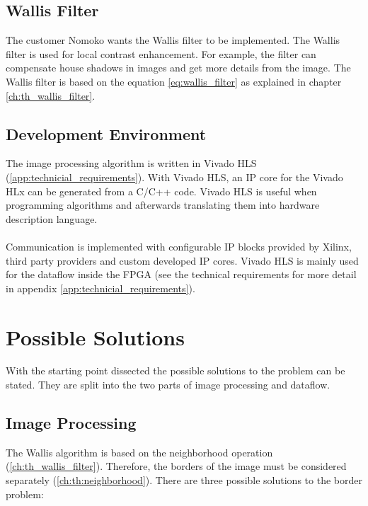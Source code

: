 \subsection{Wallis Filter} \label{chapt:mission:wallis}
The customer Nomoko wants the Wallis filter to be implemented. The Wallis
filter is used for local contrast enhancement. For example, the filter can compensate house shadows in images and get more details from the image. 
The Wallis filter is based on the equation \ref{eq:wallis_filter} as explained in chapter \ref{ch:th_wallis_filter}.


\subsection{Development Environment}
The image processing algorithm is written in Vivado HLS (\ref{app:technicial_requirements}). With Vivado HLS, an IP core for the Vivado HLx can be generated from a C/C++ code. Vivado HLS is useful when programming algorithms and afterwards translating them into hardware description language. \\ 
\\
Communication is implemented with configurable IP blocks provided by Xilinx,
third party providers and custom developed IP cores. Vivado HLS is mainly used
for the dataflow inside the FPGA
(see the technical requirements for more detail in appendix 
\ref{app:technicial_requirements}).

%
%
\section{Possible Solutions} \label{chapt:solutions}
With the starting point dissected the possible solutions to the problem can be
stated. They are split into the two parts of image processing and dataflow.

\subsection{Image Processing} \label{chapt:mission:ip}
The Wallis algorithm is based on the neighborhood operation (\ref{ch:th_wallis_filter}). Therefore, the borders of the image must be considered separately (\ref{ch:th:neighborhood}). There are three possible solutions to the border problem:

